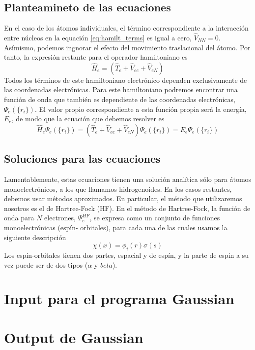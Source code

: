 \documentclass{tufte-book}
\begin{document}
\subsection{Planteamineto de las ecuaciones}
En el caso de los átomos individuales, el término correspondiente
a la interacción entre núcleos en la equación \ref{eq:hamilt_terms}
es igual a cero, $\hat{V}_{NN}=0$. Asímismo, podemos ingnorar el
efecto del movimiento traslacional del átomo. Por tanto, la expresión
restante para el operador hamiltoniano es
\begin{equation}
    \hat{H}_e   =
    (\hat{T}_e + \hat{V}_{ee} +\hat{V}_{eN})
\end{equation}
Todos los términos de este hamiltoniano electrónico dependen 
exclusivamente de las coordenadas electrónicas. Para este 
hamiltoniano podremos encontrar una función de onda que
también es dependiente de las coordenadas electrónicas,
$\Psi_e(\{r_i\})$. El valor propio correspondiente a esta
función propia será la energía, $E_e$, de modo que la 
ecuación que debemos resolver es
\begin{equation}
    \hat{H}_e\Psi_e(\{r_i\})   =
    (\hat{T}_e + \hat{V}_{ee} +\hat{V}_{eN})\Psi_e(\{r_i\})= E_e\Psi_e(\{r_i\})
\end{equation}

\subsection{Soluciones para las ecuaciones}
Lamentablemente, estas ecuaciones tienen una solución analítica
sólo para átomos monoelectrónicos, a los que llamamos 
hidrogenoides. En los casos restantes, debemos usar métodos
aproximados. En particular, el método que utilizaremos nosotros
es el de Hartree-Fock (HF). En el método de Hartree-Fock, 
la función de onda para $N$ electrones, $\Psi^{HF}_e$, se
expresa como un conjunto de funciones monoelectrónicas (espín-
orbitales), para cada una de las cuales usamos la siguiente
descripción
\begin{equation}
    \chi(x)=\phi_i(r)\sigma(s)
\end{equation}
Los espín-orbitales tienen dos partes, espacial y de espín, y
la parte de espin a su vez puede ser de dos tipos ($\alpha$
y $beta$).

\section{Input para el programa Gaussian}
\section{Output de Gaussian}
\end{document}
